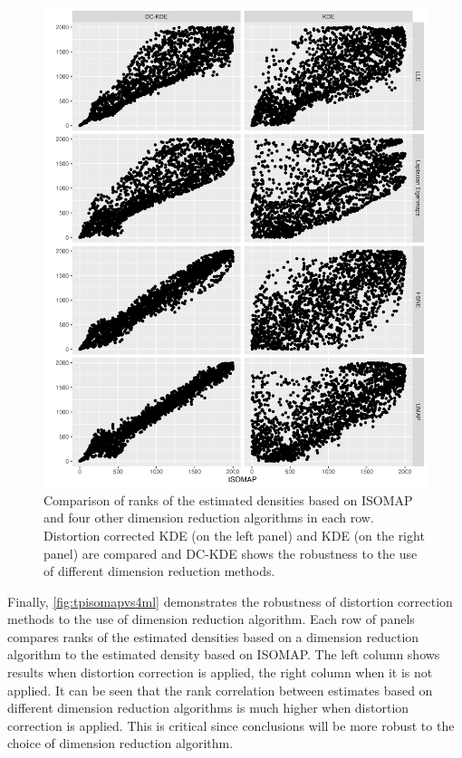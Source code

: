 \documentclass[11pt,a4paper,]{article}
\begin{document}
\begin{figure}

{\centering \includegraphics[width=0.95\linewidth]{figures/Twin Peak2000_density_compare_isomapvs4ml_radius8_r0_5_rank} 

}

\caption{Comparison of ranks of the estimated densities based on ISOMAP  and four other dimension reduction algorithms in each row. Distortion corrected KDE (on the left panel) and KDE (on the right panel) are compared and DC-KDE shows the robustness to the use of different dimension reduction methods.}\label{fig:tpisomapvs4ml}
\end{figure}

Finally, \autoref{fig:tpisomapvs4ml} demonstrates the robustness of distortion correction methods to the use of dimension reduction algorithm. Each row of panels compares ranks of the estimated densities based on a dimension reduction algorithm to the estimated density based on ISOMAP. The left column shows results when distortion correction is applied, the right column when it is not applied. It can be seen that the rank correlation between estimates based on different dimension reduction algorithms is much higher when distortion correction is applied. This is critical since conclusions will be more robust to the choice of dimension reduction algorithm.
\end{document}
